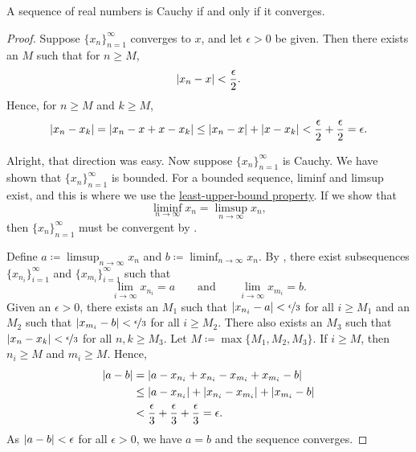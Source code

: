 \begin{thm}
A sequence of real numbers is Cauchy if and only if it converges.
\end{thm}

\begin{proof}
Suppose $\{ x_n \}_{n=1}^\infty$ converges to $x$,
and
let $\epsilon > 0$ be given.
Then there 
exists an $M$ such that for $n \geq M$,
\begin{equation*}
\lvert {x_n - x} \rvert < \frac{\epsilon}{2} .
\end{equation*}
Hence, for $n \geq M$ and $k \geq M$,
\begin{equation*}
\lvert {x_n - x_k} \rvert = 
\lvert {x_n - x + x - x_k} \rvert
\leq \lvert {x_n-x} \rvert + \lvert {x-x_k} \rvert < \frac{\epsilon}{2} + \frac{\epsilon}{2} =
\epsilon .
\end{equation*}

Alright, that direction was easy.  Now suppose $\{ x_n \}_{n=1}^\infty$ is Cauchy.
We have shown that $\{ x_n \}_{n=1}^\infty$ is bounded.
For a bounded sequence, liminf and limsup exist, and this is
where we use the
\hyperref[defn:lub]{least-upper-bound property}.
If we show that
\begin{equation*}
\liminf_{n\to \infty} x_n = \limsup_{n\to\infty} x_n ,
\end{equation*}
then $\{ x_n \}_{n=1}^\infty$ must be convergent by .


Define $a \coloneqq \limsup_{n\to\infty} x_n$ and
$b \coloneqq \liminf_{n\to\infty} x_n$.
By , there exist subsequences
$\{ x_{n_i} \}_{i=1}^\infty$ and
$\{ x_{m_i} \}_{i=1}^\infty$ such that
\begin{equation*}
\lim_{i\to\infty} x_{n_i} = a
\qquad \text{and} \qquad
\lim_{i\to\infty} x_{m_i} = b.
\end{equation*}
Given an $\epsilon > 0$,
there exists an $M_1$ such that
$\lvert {x_{n_i} - a} \rvert < \nicefrac{\epsilon}{3}$ for all $i \geq M_1$
and an $M_2$ such that
$\lvert {x_{m_i} - b} \rvert < \nicefrac{\epsilon}{3}$ for all $i \geq M_2$.
There also exists an $M_3$
such that
$\lvert {x_n-x_k} \rvert < \nicefrac{\epsilon}{3}$
for all $n,k \geq M_3$.
Let $M \coloneqq \max \{ M_1, M_2, M_3 \}$.
If $i \geq M$, then $n_i \geq M$ and $m_i \geq M$.  Hence,
\begin{equation*}
\begin{split}
\lvert {a-b} \rvert & =
\lvert {a-x_{n_i}+x_{n_i}
-x_{m_i}+x_{m_i}
-b} \rvert \\
& \leq
\lvert {a-x_{n_i}} \rvert
+ \lvert {x_{n_i} -x_{m_i}} \rvert
+ \lvert {x_{m_i} -b} \rvert \\
& <
\frac{\epsilon}{3}
+
\frac{\epsilon}{3}
+
\frac{\epsilon}{3}
= \epsilon .
\end{split}
\end{equation*}
As $\lvert {a-b} \rvert < \epsilon$ for all $\epsilon > 0$, we have $a=b$ and 
the sequence converges.
\end{proof}

